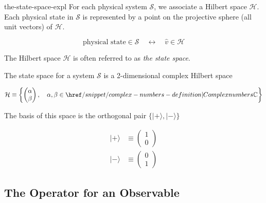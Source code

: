 \documentclass[preview]{standalone}
\begin{document}
\begin{snippet}{the-state-space-expl}
    For each physical system \(\mathscr{S}\), we associate a Hilbert space \(\mathcal{H}\).
    Each physical state in \(\mathscr{S}\) is represented by a point on the projective sphere (all unit vectors) of \(\mathcal{H}\).

    \[
        \text{physical state} \in \mathscr{S} \quad\longleftrightarrow\quad \hat{v} \in \mathcal{H}
    \]

    The Hilbert space \(\mathcal{H}\) is often referred to as \textit{the state space}.

    The state space for a system \(\mathscr{S}\) is a 2-dimensional complex Hilbert space

    \[
        \mathcal{H} \equiv
        \left\{
            \begin{pmatrix}
                \alpha \\
                \beta
            \end{pmatrix}
            ,\quad \alpha ,\beta \in \complexnumbers
        \right\}
    \]

    The basis of this space is the orthogonal pair \(\{|+\rangle ,|-\rangle\}\)

    \begin{align*}
        |+\rangle &\equiv
        \begin{pmatrix}
            1 \\
            0
        \end{pmatrix} \\
        |-\rangle &\equiv
        \begin{pmatrix}
            0 \\
            1
        \end{pmatrix}
    \end{align*}

\end{snippet}

\subsection{The Operator for an Observable}
\end{document}

